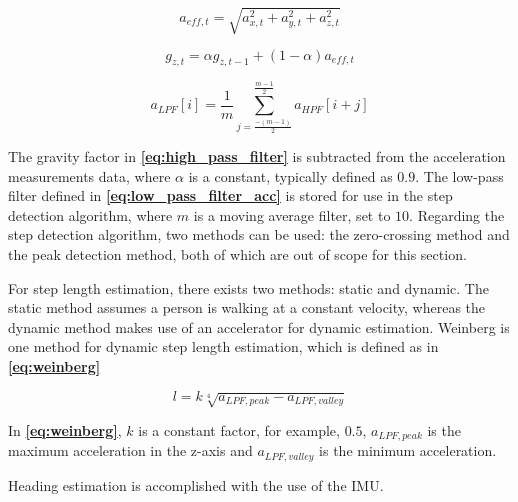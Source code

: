 \begin{equation} \label{eq:acc_measurements}
    a_{eff, t} = \sqrt{a_{x, t}^2 + a_{y, t}^2 + a_{z, t}^2}
\end{equation}

\begin{equation} \label{eq:high_pass_filter}
    g_{z, t} = \alpha g_{z, t - 1} + (1 - \alpha) a_{eff, t}
\end{equation}

\begin{equation} \label{eq:low_pass_filter_acc}
    a_{LPF}[i] = \frac{1}{m} \sum_{j = \frac{-(m - 1)}{2}}^{\frac{m - 1}{2}} a_{HPF}[i + j]
\end{equation}

The gravity factor in \textbf{\autoref{eq:high_pass_filter}} is subtracted from the acceleration measurements data, where $\alpha$ is a constant, typically defined as $0.9$. The low-pass filter defined in \textbf{\autoref{eq:low_pass_filter_acc}} is stored for use in the step detection algorithm, where $m$ is a moving average filter, set to $10$.
Regarding the step detection algorithm, two methods can be used: the zero-crossing method and the peak detection method, both of which are out of scope for this section.

For step length estimation, there exists two methods: static and dynamic. The static method assumes a person is walking at a constant velocity, whereas the dynamic method makes use of an accelerator for dynamic estimation. Weinberg is one method for dynamic step length estimation, which is defined as in \textbf{\autoref{eq:weinberg}}

\begin{equation} \label{eq:weinberg}
    l = k \sqrt[4]{a_{LPF, peak} - a_{LPF, valley}}
\end{equation}

In \textbf{\autoref{eq:weinberg}}, $k$ is a constant factor, for example, $0.5$, $a_{LPF, peak}$ is the maximum acceleration in the z-axis and $a_{LPF, valley}$ is the minimum acceleration.

Heading estimation is accomplished with the use of the IMU.